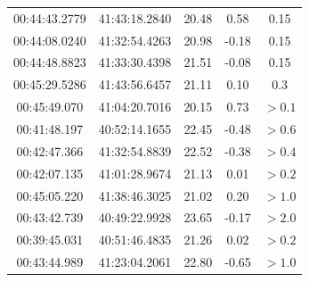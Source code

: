 \documentclass[iop, apj]{emulateapj}
\newcommand{\?}{\stackrel{?}{=}}
\begin{document}
\begin{table}[t]
\begin{center}
\begin{tabular}{ccccc}
00:44:43.2779	&41:43:18.2840		&20.48	&0.58 	&0.15	\\%
00:44:08.0240	&41:32:54.4263		&20.98	&-0.18 	&0.15	\\%
00:44:48.8823	&41:33:30.4398		&21.51	&-0.08 	&0.15	\\%
00:45:29.5286	&41:43:56.6457		&21.11	&0.10 	&0.3	\\%
00:45:49.070	&41:04:20.7016		&20.15	&0.73	&$>0.1$	\\%
00:41:48.197	&40:52:14.1655		&22.45	&-0.48 	&$>0.6$	\\%
00:42:47.366	&41:32:54.8839		&22.52	&-0.38 	&$>0.4$	\\%
00:42:07.135	&41:01:28.9674		&21.13	&0.01 	&$>0.2$	\\%
00:45:05.220	&41:38:46.3025		&21.02	&0.20 	&$>1.0$	\\%
00:43:42.739	&40:49:22.9928		&23.65	&-0.17 	&$>2.0$	\\%
00:39:45.031	&40:51:46.4835		&21.26	&0.02 	&$>0.2$	\\%
00:43:44.989	&41:23:04.2061		&22.80	&-0.65 	&$>1.0$	\\%
\hline
  	\end{tabular}
	   \end{center}
   \end{table}



\clearpage
\end{document}
